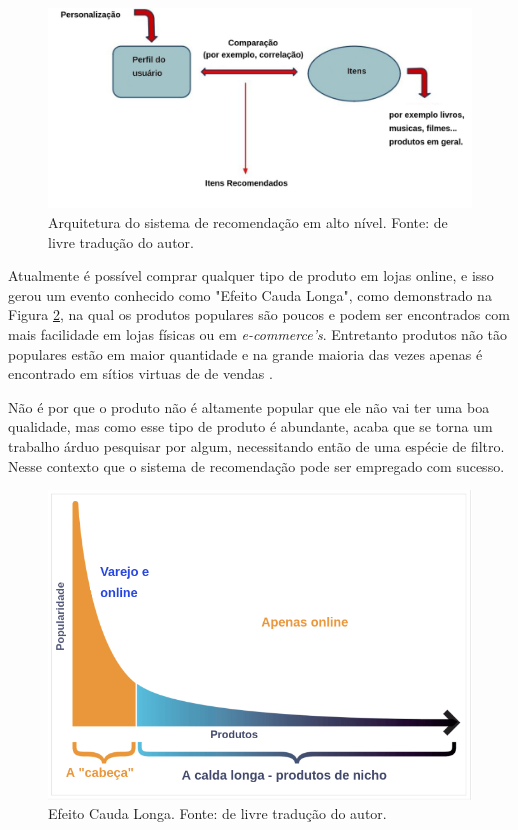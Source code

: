 \begin{figure}[H]
    \centering
    \includegraphics[scale=0.35]{figuras/referencial_teorico/sr_arquitetura.png}
    \caption[Arquitetura do sistema de recomendação em alto nível]{Arquitetura do sistema de recomendação em alto nível. Fonte: \cite{Stefanos:2008} de livre tradução do autor.}
    \label{fig:sr_arquitetura}
\end{figure}

Atualmente é possível comprar qualquer tipo de produto em lojas online, e isso gerou um evento conhecido como "Efeito Cauda Longa", como demonstrado na Figura \ref{fig:efeito_cauda}, na qual os produtos populares são poucos e podem ser encontrados com mais facilidade em lojas físicas ou em \textit{e-commerce’s}. Entretanto produtos não tão populares estão em maior quantidade e na grande maioria das vezes apenas é encontrado em sítios virtuas de de vendas \cite{pandey:2019}.

Não é por que o produto não é altamente popular que ele não vai ter uma boa qualidade, mas como esse tipo de produto é abundante, acaba que se torna um trabalho árduo pesquisar por algum, necessitando então de uma espécie de filtro. Nesse contexto que o sistema de recomendação pode ser empregado com sucesso.

\begin{figure}[H]
    \centering
    \includegraphics[scale=0.35]{figuras/referencial_teorico/efeito_cauda.png}
    \caption[Efeito Cauda Longa]{Efeito Cauda Longa. Fonte: \cite{pandey:2019} de livre tradução do autor.}
    \label{fig:efeito_cauda}
\end{figure}

